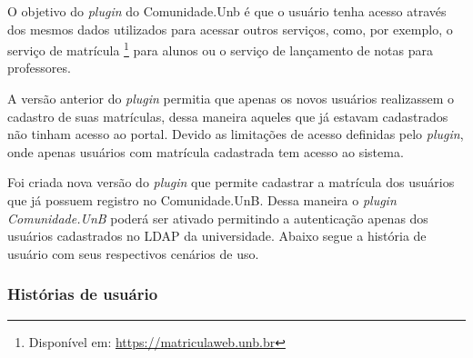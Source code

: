 O objetivo do \textit{plugin} do Comunidade.Unb é que o usuário tenha acesso através dos mesmos dados utilizados para acessar outros serviços, como, por exemplo, o serviço de matrícula \footnote{Disponível em: \url{https://matriculaweb.unb.br}} para alunos ou o serviço de lançamento de notas para professores.

A versão anterior do \textit{plugin} permitia que apenas os novos usuários realizassem o cadastro de suas matrículas, dessa maneira aqueles que já estavam cadastrados não tinham acesso ao portal. Devido as limitações de acesso definidas pelo \textit{plugin}, onde apenas usuários com matrícula cadastrada tem acesso ao sistema.

Foi criada nova versão do \textit{plugin} que permite cadastrar a matrícula dos usuários que já possuem registro no Comunidade.UnB. Dessa maneira o \textit{plugin Comunidade.UnB} poderá ser ativado permitindo a autenticação apenas dos usuários cadastrados no LDAP da universidade. Abaixo segue a história de usuário com seus respectivos cenários de uso.

\subsubsection*{Histórias de usuário}


